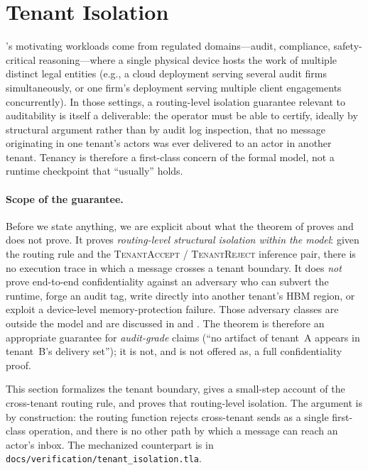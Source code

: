 \section{Tenant Isolation}
\label{sec:tenancy}

\system{}'s motivating workloads come from regulated domains—audit,
compliance, safety-critical reasoning—where a single physical device
hosts the work of multiple distinct legal entities (e.g., a cloud
deployment serving several audit firms simultaneously, or one firm's
deployment serving multiple client engagements concurrently).  In
those settings, a routing-level isolation guarantee relevant to
auditability is itself a deliverable: the operator must be able to
certify, ideally by structural argument rather than by audit log
inspection, that no message originating in one tenant's actors was
ever delivered to an actor in another tenant.  Tenancy is therefore
a first-class concern of the formal model, not a runtime checkpoint
that ``usually'' holds.

\paragraph{Scope of the guarantee.}
Before we state anything, we are explicit about what the theorem of
 proves and does not prove.  It proves
\emph{routing-level structural isolation within the model}: given
the routing rule and the \textsc{TenantAccept} / \textsc{TenantReject}
inference pair, there is no execution trace in which a message
crosses a tenant boundary.  It does \emph{not} prove end-to-end
confidentiality against an adversary who can subvert the runtime,
forge an audit tag, write directly into another tenant's HBM
region, or exploit a device-level memory-protection failure.
Those adversary classes are outside the model and are discussed in
 and .  The theorem
is therefore an appropriate guarantee for \emph{audit-grade} claims
(``no artifact of tenant~A appears in tenant~B's delivery set'');
it is not, and is not offered as, a full confidentiality proof.

This section formalizes the tenant boundary, gives a small-step
account of the cross-tenant routing rule, and proves that
routing-level isolation.  The argument is by construction: the
routing function rejects cross-tenant sends as a single first-class
operation, and there is no other path by which a message can reach
an actor's inbox.  The mechanized counterpart is in
\texttt{docs/verification/tenant\_isolation.tla}.

